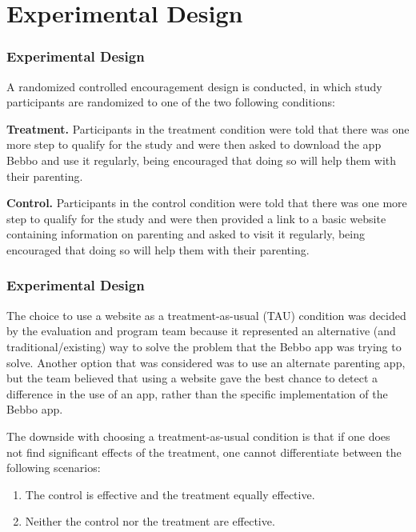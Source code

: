 \documentclass[aspectratio=169]{beamer}
\begin{document}
\section{Experimental Design}

\begin{frame}
  \frametitle{Experimental Design}

A randomized controlled encouragement design is conducted, in which study participants are randomized to one of the two following conditions: 

\textbf{Treatment.} Participants in the treatment condition were told that there was one more step to qualify for the study and were then asked to download the app Bebbo and use it regularly, being encouraged that doing so will help them with their parenting. 

\textbf{Control.} Participants in the control condition were told that there was one more step to qualify for the study and were then provided a link to a basic website containing information on parenting and asked to visit it regularly, being encouraged that doing so will help them with their parenting. 

\end{frame}

\begin{frame}
    \frametitle{Experimental Design}

The choice to use a website as a treatment-as-usual (TAU) condition was decided by the evaluation and program team because it represented an alternative (and traditional/existing) way to solve the problem that the Bebbo app was trying to solve. Another option that was considered was to use an alternate parenting app, but the team believed that using a website gave the best chance to detect a difference in the use of an app, rather than the specific implementation of the Bebbo app.  

The downside with choosing a treatment-as-usual condition is that if one does not find significant effects of the treatment, one cannot differentiate between the following scenarios: 

\begin{enumerate}
\item The control is effective and the treatment equally effective. 
\item Neither the control nor the treatment are effective. 
\end{enumerate}
    

\end{frame}
\end{document}
